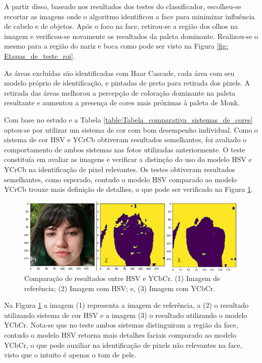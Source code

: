 A partir disso, baseado nos resultados dos testes do classificador, escolheu-se recortar as imagens onde o algoritmo identificou a face para minimizar influência de cabelo e de objetos. Após o foco na face, retirou-se a região dos olhos na imagem e verificou-se novamente os resultados da paleta dominante. Realizou-se o mesmo para a região do nariz e boca como pode ser visto na Figura \ref{fig: Etapas_de_teste_roi}.

As áreas excluídas são identificadas com Haar Cascade, cada área com seu modelo próprio de identificação, e pintadas de preto para retirada dos pixels. A retirada das áreas melhorou a percepção de coloração dominante na paleta resultante e aumentou a presença de cores mais próximas à paleta de Monk.

Com base no estudo \cite{Automatic_Skin_Tone_Extraction_for_Visagism_Applications} e a Tabela \ref{table:Tabela_comparativa_sistemas_de_cores} optou-se por utilizar um sistema de cor com bom desempenho individual. Como o sistema de cor HSV e YCrCb obtiveram resultados semelhantes, foi avaliado o comportamento de ambos sistemas nas fotos utilizadas anteriormente. O teste constituía em avaliar as imagens e verificar a distinção do uso do modelo HSV e YCrCb na identificação de pixel relevantes. Os testes obtiveram resultados semelhantes, como esperado, contudo o modelo HSV comparado ao modelo YCrCb trouxe mais definição de detalhes, o que pode ser verificado na Figura \ref{fig:x Etapas_de_teste_cores}.

\begin{figure}[h]
\centering
\caption{Comparação de resultados entre HSV e YCbCr. (1) Imagem de referência; (2) Imagem com HSV; e, (3) Imagem com YCbCr.}
\includegraphics[scale=1.2]{Template_Latex_TCC-UNIFTEC/_lib/imagens/testHsvYcbcr.png}

\label{fig:x Etapas_de_teste_cores}
\end{figure}


Na Figura \ref{fig:x Etapas_de_teste_cores} a imagem (1) representa a imagem de referência, a (2) o resultado utilizando sistema de cor HSV e a imagem (3) o resultado utilizando o modelo YCbCr. Nota-se que no teste ambos sistemas distinguiram a região da face, contudo o modelo HSV retorna mais detalhes faciais comparado ao modelo YCbCr, o que pode auxiliar na identificação de pixels não relevantes na face, visto que o intuito é apenas o tom de pele.

